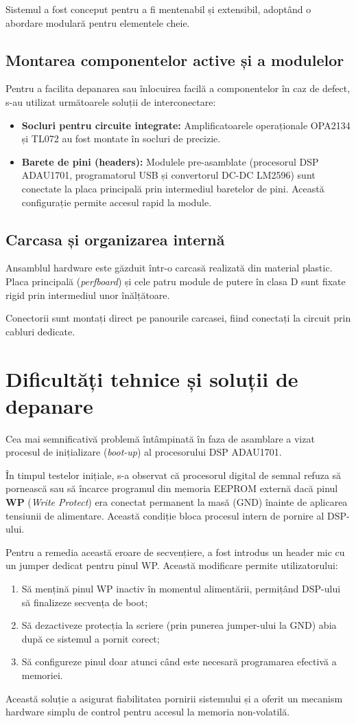 Sistemul a fost conceput pentru a fi mentenabil și extensibil, adoptând o abordare modulară pentru elementele cheie.

\subsection{Montarea componentelor active și a modulelor}
Pentru a facilita depanarea sau înlocuirea facilă a componentelor în caz de defect, s-au utilizat următoarele soluții de interconectare:
\begin{itemize}
    \item \textbf{Socluri pentru circuite integrate:} Amplificatoarele operaționale OPA2134 și TL072 au fost montate în socluri de precizie.
    \item \textbf{Barete de pini (headers):} Modulele pre-asamblate (procesorul DSP ADAU1701, programatorul USB și convertorul DC-DC LM2596) sunt conectate la placa principală prin intermediul baretelor de pini. Această configurație permite accesul rapid la module.
\end{itemize}

\subsection{Carcasa și organizarea internă}
Ansamblul hardware este găzduit într-o carcasă realizată din material plastic. Placa principală (\textit{perfboard}) și cele patru module de putere în clasa D sunt fixate rigid prin intermediul unor înălțătoare.

Conectorii sunt montați direct pe panourile carcasei, fiind conectați la circuit prin cabluri dedicate.

\section{Dificultăți tehnice și soluții de depanare}

Cea mai semnificativă problemă întâmpinată în faza de asamblare a vizat procesul de inițializare (\textit{boot-up}) al procesorului DSP ADAU1701.

În timpul testelor inițiale, s-a observat că procesorul digital de semnal refuza să pornească sau să încarce programul din memoria EEPROM externă dacă pinul \textbf{WP} (\textit{Write Protect}) era conectat permanent la masă (GND) înainte de aplicarea tensiunii de alimentare. Această condiție bloca procesul intern de pornire al DSP-ului.

Pentru a remedia această eroare de secvențiere, a fost introdus un header mic cu un jumper dedicat pentru pinul WP. Această modificare permite utilizatorului:
\begin{enumerate}
    \item Să mențină pinul WP inactiv în momentul alimentării, permițând DSP-ului să finalizeze secvența de boot;
    \item Să dezactiveze protecția la scriere (prin punerea jumper-ului la GND) abia după ce sistemul a pornit corect;
    \item Să configureze pinul doar atunci când este necesară programarea efectivă a memoriei.
\end{enumerate}

Această soluție a asigurat fiabilitatea pornirii sistemului și a oferit un mecanism hardware simplu de control pentru accesul la memoria non-volatilă.
